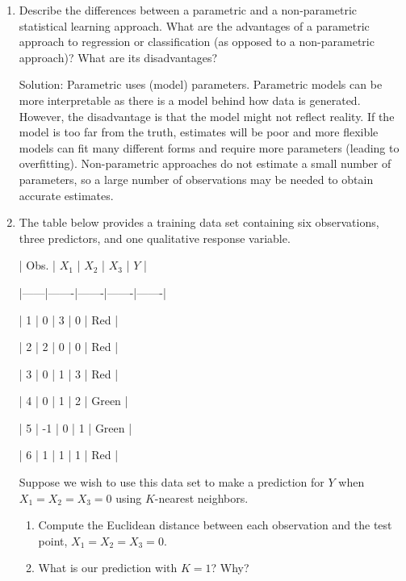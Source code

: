 \documentclass{article}
\begin{document}
\begin{enumerate}
Solution: Inflexible is more interpretable, fewer observations required, can be biased if the underlying function is over complex.
Flexible can overfit (high error variance). In cases where we have high $n$ or
non-linear patterns, flexible will be preferred.

\item Describe the differences between a parametric and a non-parametric statistical
 learning approach. What are the advantages of a parametric approach to
 regression or classification (as opposed to a non-parametric approach)? What
 are its disadvantages?

Solution: Parametric uses (model) parameters. Parametric models can be more interpretable
as there is a model behind how data is generated. However, the disadvantage is
that the model might not reflect reality. If the model is too far from the
truth, estimates will be poor and more flexible models can fit many different
forms and require more parameters (leading to overfitting). Non-parametric
approaches do not estimate a small number of parameters, so a large number
of observations may be needed to obtain accurate estimates.

\item The table below provides a training data set containing six observations,
three predictors, and one qualitative response variable.
 
 | Obs. | $X_1$ | $X_2$ | $X_3$ | $Y$   |
 
 |------|-------|-------|-------|-------|
 
 | 1    | 0     | 3     | 0     | Red   |
 
 | 2    | 2     | 0     | 0     | Red   |
 
 | 3    | 0     | 1     | 3     | Red   |
 
 | 4    | 0     | 1     | 2     | Green |
 
 | 5    | -1    | 0     | 1     | Green |
 
 | 6    | 1     | 1     | 1     | Red   |
 
Suppose we wish to use this data set to make a prediction for $Y$ when 
$X_1 = X_2 = X_3 = 0$ using $K$-nearest neighbors.

\begin{enumerate}
\item Compute the Euclidean distance between each observation and the test
    point, $X_1 = X_2 = X_3 = 0$.
\item What is our prediction with $K = 1$? Why?


\end{enumerate}
\end{enumerate}
\end{document}

